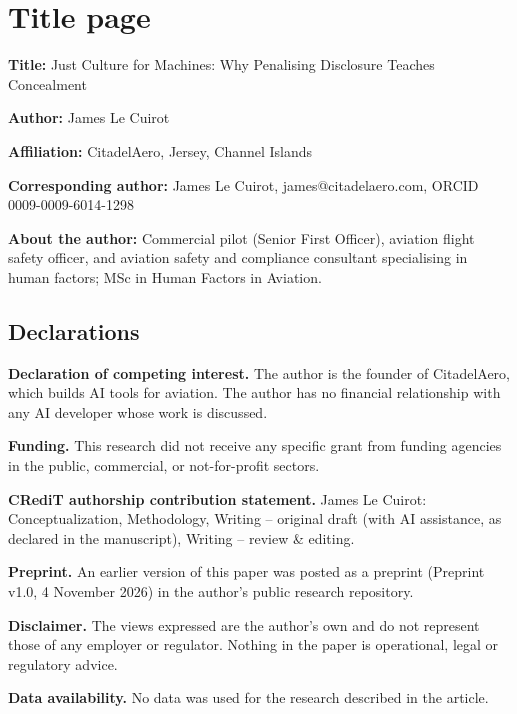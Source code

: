 \documentclass[12pt]{article}
\begin{document}
\section*{Title page}

\textbf{Title:} Just Culture for Machines: Why Penalising Disclosure Teaches Concealment

\textbf{Author:} James Le Cuirot

\textbf{Affiliation:} CitadelAero, Jersey, Channel Islands

\textbf{Corresponding author:} James Le Cuirot, james@citadelaero.com, ORCID 0009-0009-6014-1298

\textbf{About the author:} Commercial pilot (Senior First Officer), aviation flight safety officer, and aviation safety and compliance consultant specialising in human factors; MSc in Human Factors in Aviation.

\subsection*{Declarations}

\textbf{Declaration of competing interest.} The author is the founder of CitadelAero, which builds AI tools for aviation. The author has no financial relationship with any AI developer whose work is discussed.

\textbf{Funding.} This research did not receive any specific grant from funding agencies in the public, commercial, or not-for-profit sectors.

\textbf{CRediT authorship contribution statement.} James Le Cuirot: Conceptualization, Methodology, Writing -- original draft (with AI assistance, as declared in the manuscript), Writing -- review \& editing.

\textbf{Preprint.} An earlier version of this paper was posted as a preprint (Preprint v1.0, 4 November 2026) in the author's public research repository.

\textbf{Disclaimer.} The views expressed are the author's own and do not represent those of any employer or regulator. Nothing in the paper is operational, legal or regulatory advice.

\textbf{Data availability.} No data was used for the research described in the article.
\end{document}
